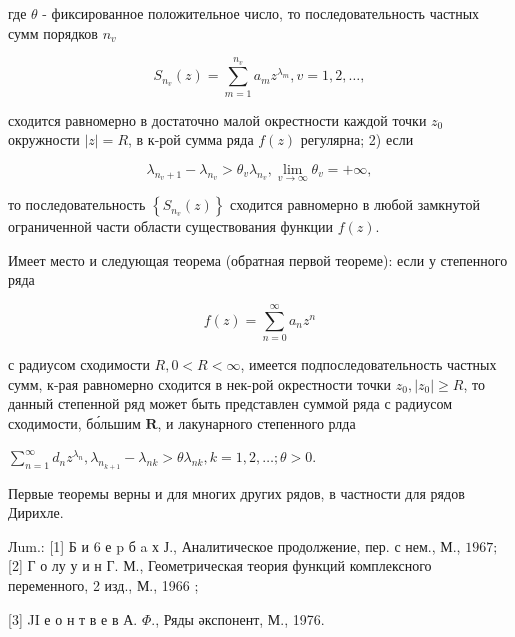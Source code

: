 \documentclass[10pt]{article}
\begin{document}
где $\theta$ - фиксированное положительное число, то последовательность частных сумм порядков $n_{v}$



\[

S_{n_{v}}(z)=\sum_{m=1}^{n_{v}} a_{m} z^{\lambda_{m}}, v=1,2, \ldots,

\]



сходится равномерно в достаточно малой окрестности каждой точки $z_{0}$ окружности $|z|=R$, в к-рой сумма ряда $f(z)$ регулярна; 2) если



\[

\lambda_{n_{v}+1}-\lambda_{n_{v}}>\theta_{v} \lambda_{n_{v}}, \lim _{v \rightarrow \infty} \theta_{v}=+\infty,

\]



то последовательность $\left\{S_{n_{v}}(z)\right\}$ сходится равномерно в любой замкнутой ограниченной части области существования функции $f(z)$.



Имеет место и следующая теорема (обратная первой теореме): если у степенного ряда



\[

f(z)=\sum_{n=0}^{\infty} a_{n} z^{n}

\]



с радиусом сходимости $R, 0<R<\infty$, имеется подпоследовательность частных сумм, к-рая равномерно сходится в нек-рой окрестности точки $z_{0},\left|z_{0}\right| \geqslant R$, то данный степенной ряд может быть представлен суммой ряда с радиусом сходимости, бо́льшим $\mathbf{R}$, и лакунарного степенного рлда



$\sum_{n=1}^{\infty} d_{n} z^{\lambda_{n}}, \lambda_{n_{k+1}}-\lambda_{n k}>\theta \lambda_{n k}, k=1,2, \ldots ; \theta>0$.



Первые теоремы верны и для многих других рядов, в частности для рядов Дирихле.



Лum.: [1] Б и 6 е p б a х Ј., Аналитическое продолжение, пер. с нем., М., $1967 ;$ [2] Г о лу у и н Г. М., Геометрическая теория функций комплексного переменного, 2 изд., М., 1966 ;

[3] JI е о н т в е в А. $\Phi .$, Ряды әкспонент, М., 1976.
\end{document}
